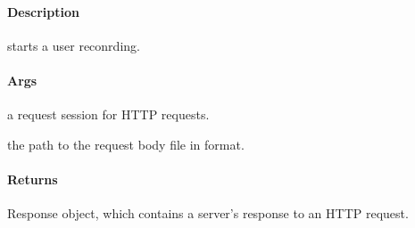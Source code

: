 \documentclass[letterpaper,10pt,english]{sphinxmanual}
\begin{document}
\begin{fulllineitems}
\label{\detokenize{gemini_lidar_hub_API:gemini_lidar_hub_API.start_lidar_hub_rec}}
\pysigstartsignatures
{}
\pysigstopsignatures

\paragraph{Description}
\label{\detokenize{gemini_lidar_hub_API:id50}}
\sphinxAtStartPar
starts a user reconrding.


\paragraph{Args}
\label{\detokenize{gemini_lidar_hub_API:id51}}\begin{description}
\sphinxAtStartPar
a request session for HTTP requests.

\sphinxAtStartPar
the path to the request body file in  format.

\end{description}


\paragraph{Returns}
\label{\detokenize{gemini_lidar_hub_API:id52}}\begin{description}
\sphinxAtStartPar
Response object, which contains a server’s response to an HTTP request.

\end{description}

\end{fulllineitems}

\end{document}
